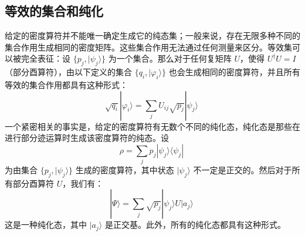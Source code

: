 \subsection{等效的集合和纯化} 
给定的密度算符并不能唯一确定生成它的纯态集；一般来说，存在无限多种不同的集合作用生成相同的密度矩阵。这些集合作用无法通过任何测量来区分。等效集可以被完全表征：设  
\(\{ p_j, |\psi_j\rangle \}\)  
为一个集合。那么对于任何复矩阵 \(U\)，使得  
\( U^\dagger U = I \)（部分酉算符），由以下定义的集合  
\(\{ q_i, |\varphi_i\rangle \}\)  
也会生成相同的密度算符，并且所有等效的集合作用都具有这种形式：
\[
\sqrt{q_i} |\varphi_i\rangle = \sum_j U_{ij} \sqrt{p_j} |\psi_j\rangle~
\]
一个紧密相关的事实是，给定的密度算符有无数个不同的纯化态，纯化态是那些在进行部分迹运算时生成该密度算符的纯态。设  
\[\rho = \sum_j p_j |\psi_j\rangle \langle \psi_j|~\] 
为由集合  
\(\{ p_j, |\psi_j\rangle \}\)  
生成的密度算符，其中状态  
\( |\psi_j\rangle \) 不一定是正交的。然后对于所有部分酉算符 \( U \)，我们有：
\[
|\Psi\rangle = \sum_j \sqrt{p_j} |\psi_j\rangle U |a_j\rangle~
\]
这是一种纯化态，其中  
\( |a_j\rangle \) 是正交基。此外，所有的纯化态都具有这种形式。